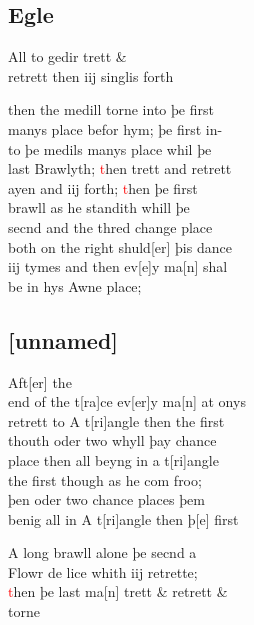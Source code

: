 \documentclass[12pt,letter]{article} %
\newcommand{\red}[1]{\textcolor{red}{#1}}
\newcommand{\srcpg}[1]{
    \noindent{
        \color{Gray}{\rule[0.5ex]{\linewidth}{1pt}~#1} 
    
    }
}
\begin{document}
\subsection{Egle}
All to gedir trett \& \\ 
retrett then iij singlis forth 
\srcpg{57}
then the medill torne into þe first \\ 
manys place befor hym; þe first in-\\
to þe medils manys place whil þe \\
last Brawlyth; \red{t}hen trett and retrett \\
ayen and iij forth; \red{t}hen þe first \\
brawll as he standith whill þe \\
secnd and the thred change place \\
both on the right shuld{[}er{]} þis dance \\
iij tymes and then ev{[}e{]}y ma{[}n{]} shal \\
be in hys Awne place;

\subsection{{[}unnamed{]}}
Aft{[}er{]} the \\
end of the t{[}ra{]}ce ev{[}er{]}y ma{[}n{]} at onys \\
retrett to A t{[}ri{]}angle then the first \\
thouth oder two whyll þay chance \\
place then all beyng in a t{[}ri{]}angle \\
the first though as he com froo; \\
þen oder two chance places þem \\
benig all in A t{[}ri{]}angle then þ{[}e{]} first 
\srcpg{58} 
A long brawll alone þe secnd a \\
Flowr de lice whith iij retrette; \\
\red{t}hen þe last ma{[}n{]} trett \& retrett \& \\
torne
\end{document}

